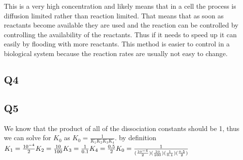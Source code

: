 \documentclass[12pt]{article}
\begin{document}
This is a very high concentration and likely means that in a cell the process is diffusion limited rather than reaction limited. That means that as soon as reactants become available they are used and the reaction can be controlled by controlling the availability of the reactants. Thus if it needs to speed up it can easily by flooding with more reactants. This method is easier to control in a biological system because the reaction rates are usually not easy to change.

\subsection{Q4}

\subsection{Q5}
We know that the product of all of the dissociation constants should be 1, thus we can solve for $K_0$ as $K_0 = \frac{1}{K_1K_2K_3K_4}.$ by definition\\
$
K_1 = \frac{10^{-4}}{2}\\
K_2 = \frac{10}{100}\\
K_3 = \frac{1}{0.1}\\
K_4 = \frac{0.5}{2}\\
K_0 = \frac{1}{(\frac{10^{-4}}{2})(\frac{10}{100})(\frac{1}{0.1})(\frac{0.5}{2})}\\
$
\end{document}
